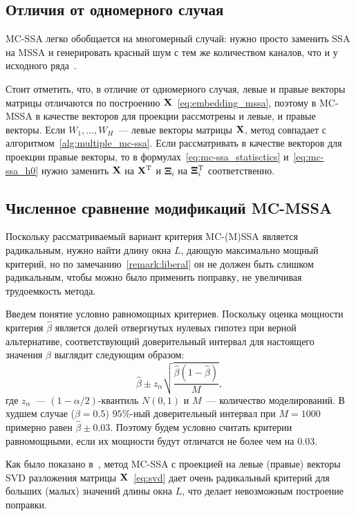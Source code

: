 \documentclass[specialist,
substylefile = spbu.rtx,
               subf,href,colorlinks=true, 12pt]{disser}
\theoremstyle{definition}
\begin{document}
\subsection{Отличия от одномерного случая}
MC-SSA легко обобщается на многомерный случай: нужно просто заменить SSA на MSSA и генерировать красный шум с тем же количеством каналов, что и у исходного ряда~\cite{Groth2015}.

Стоит отметить, что, в отличие от одномерного случая, левые и правые векторы матрицы отличаются по построению $\mathbf{X}$~\eqref{eq:embedding_mssa}, поэтому в MC-MSSA в качестве векторов для проекции рассмотрены и левые, и правые векторы. Если $W_1,\ldots,W_H$~--- левые векторы матрицы $\mathbf{X}$, метод совпадает с алгоритмом~\ref{alg:multiple_mc-ssa}. Если рассматривать в качестве векторов для проекции правые векторы, то в формулах~\eqref{eq:mc-ssa_statisctics} и~\eqref{eq:mc-ssa_h0} нужно заменить $\mathbf{X}$ на $\mathbf{X}^{\mathrm{T}}$ и $\mathbf{\Xi}_i$ на $\mathbf{\Xi}_i^{\mathrm{T}}$ соответственно.

\subsection{Численное сравнение модификаций MC-MSSA}\label{sect:mc-mssa_numeric_comparison}
Поскольку рассматриваемый вариант критерия MC-(M)SSA является радикальным, нужно найти длину окна $L$, дающую максимально мощный критерий, но по замечанию~\ref{remark:liberal} он не должен быть слишком радикальным, чтобы можно было применить поправку, не увеличивая трудоемкость метода.

Введем понятие условно равномощных критериев. Поскольку оценка мощности критерия $\hat \beta$ является долей отвергнутых нулевых гипотез при верной альтернативе, соответствующий доверительный интервал для настоящего значения $\beta$ выглядит следующим образом:
\[
	\hat \beta \pm z_\alpha \sqrt{\frac{\hat \beta(1 - \hat \beta)}M},
\]
где $z_\alpha$~--- $(1-\alpha/2)$-квантиль $N(0, 1)$ и $M$~--- количество моделирований. В худшем случае ($\beta=0.5$) $95\%$-ный доверительный интервал при $M=1000$ примерно равен $\hat\beta \pm 0.03$. Поэтому будем условно считать критерии равномощными, если их мощности будут отличатся не более чем на $0.03$.

Как было показано в~\cite[Приложение  Б.2.4]{Larin2022}, метод MC-SSA с проекцией на левые (правые) векторы SVD разложения матрицы $\mathbf{X}$~\eqref{eq:svd} дает очень радикальный критерий для больших (малых) значений длины окна $L$, что делает невозможным построение поправки.
\end{document}
